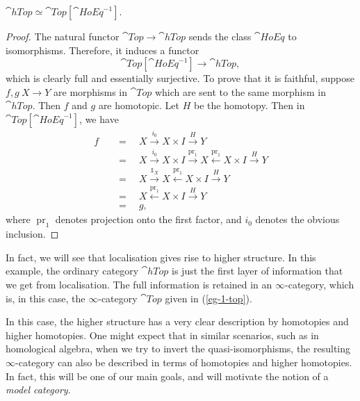 \begin{proposition} \label{thm-1-htop}
    $\cat{hTop}\simeq\cat{Top}[\cat{HoEq}^{-1}]$.
\end{proposition}

\begin{proof}
    The natural functor $\cat{Top}\to\cat{hTop}$ sends the class $\cat{HoEq}$ to isomorphisms.
    Therefore, it induces a functor 
    \[ \cat{Top}[\cat{HoEq}^{-1}]\to\cat{hTop}, \]
    which is clearly full and essentially surjective.
    To prove that it is faithful, suppose $f,g \: X \to Y$
    are morphisms in $\cat{Top}$ which are sent to the same morphism in $\cat{hTop}$.
    Then $f$ and $g$ are homotopic. Let $H$ be the homotopy.
    Then in $\cat{Top}[\cat{HoEq}^{-1}]$, we have
    \[ \begin{aligned}
        f \quad &= \quad X \xrightarrow{i_0} X \times I \xrightarrow{H} Y \\
        &= \quad X \xrightarrow{i_0} X \times I
        \xrightarrow{\operatorname{pr}_1} X
        \xleftarrow{\operatorname{pr}_1} X \times I \xrightarrow{H} Y \\
        &= \quad X \xrightarrow{\mathbb{1}_X} X
        \xleftarrow{\operatorname{pr}_1} X \times I \xrightarrow{H} Y \\
        &= \quad X \xleftarrow{\operatorname{pr}_1} X \times I \xrightarrow{H} Y \\
        &= \quad g,
    \end{aligned} \]
    where $\operatorname{pr}_1$ denotes projection onto the first factor,
    and $i_0$ denotes the obvious inclusion.
\end{proof}

In fact, we will see that localisation gives rise to higher structure.
In this example, the ordinary category $\cat{hTop}$
is just the first layer of information that we get from localisation.
The full information is retained in an $\infty$-category,
which is, in this case, the $\infty$-category $\cat{Top}$ 
given in (\ref{eg-1-top}).

In this case,
the higher structure has a very clear description
by homotopies and higher homotopies.
One might expect that in similar scenarios,
such as in homological algebra,
when we try to invert the quasi-isomorphisms,
the resulting $\infty$-category can also be described 
in terms of homotopies and higher homotopies.
In fact, this will be one of our main goals,
and will motivate the notion of a \emph{model category}.

